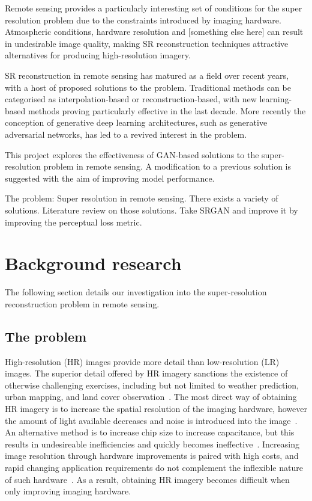 Remote sensing provides a particularly interesting set of conditions for the super resolution problem due to the constraints introduced by imaging hardware. Atmospheric conditions, hardware resolution and [something else here] can result in undesirable image quality, making SR reconstruction techniques attractive alternatives for producing high-resolution imagery.

SR reconstruction in remote sensing has matured as a field over recent years, with a host of proposed solutions to the problem. Traditional methods can be categorised as interpolation-based or reconstruction-based, with new learning-based methods proving particularly effective in the last decade. More recently the conception of generative deep learning architectures, such as generative adversarial networks, has led to a revived interest in the problem.

This project explores the effectiveness of GAN-based solutions to the super-resolution problem in remote sensing. A modification to a previous solution is suggested with the aim of improving model performance.

The problem: Super resolution in remote sensing. There exists a variety of solutions. Literature review on those solutions. Take SRGAN and improve it by improving the perceptual loss metric.

\clearpage
\section{Background research}\label{sec:background_research}
The following section details our investigation into the super-resolution reconstruction problem in remote sensing.
\subsection{The problem}
High-resolution (HR) images provide more detail than low-resolution (LR) images. The superior detail offered by HR imagery sanctions the existence of otherwise challenging exercises, including but not limited to weather prediction, urban mapping, and land cover observation~\cite{urbanMapping, mapping, cloudCover, vegetationMapping}. The most direct way of obtaining HR imagery is to increase the spatial resolution of the imaging hardware, however the amount of light available decreases and noise is introduced into the image~\cite{superResOverview}. An alternative method is to increase chip size to increase capacitance, but this results in undesireable inefficiencies and quickly becomes ineffective~\cite{superResOverview}. Increasing image resolution through hardware improvements is paired with high costs, and rapid changing application requirements do not complement the inflexible nature of such hardware~\cite{ref}. As a result, obtaining HR imagery becomes difficult when only improving imaging hardware.

